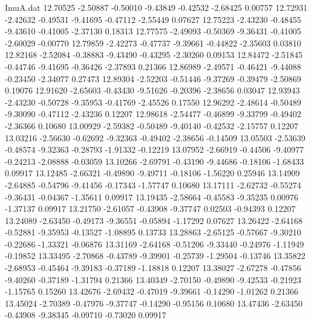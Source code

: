 \begin{filecontents}{ImuA.dat}
  12.70525   -2.50887   -0.50010   -9.43849   -0.42532   -2.68425    0.00757
  12.72931   -2.42632   -0.49531   -9.41695   -0.47112   -2.55449    0.07627
  12.75223   -2.43230   -0.48455   -9.43610   -0.41005   -2.37130    0.18313
  12.77575   -2.49093   -0.50369   -9.36431   -0.41005   -2.60029   -0.00770
  12.79859   -2.42273   -0.47737   -9.39661   -0.44822   -2.35603    0.03810
  12.82168   -2.52084   -0.38883   -9.43490   -0.43295   -2.30260    0.09153
  12.84472   -2.51845   -0.44746   -9.41695   -0.36426   -2.37893    0.21366
  12.86989   -2.49571   -0.46421   -9.44088   -0.23450   -2.34077    0.27473
  12.89304   -2.52203   -0.51446   -9.37269   -0.39479   -2.50869    0.19076
  12.91620   -2.65603   -0.43430   -9.51626   -0.20396   -2.38656    0.03047
  12.93943   -2.43230   -0.50728   -9.35953   -0.41769   -2.45526    0.17550
  12.96292   -2.48614   -0.50489   -9.30090   -0.47112   -2.43236    0.12207
  12.98618   -2.54477   -0.46899   -9.33799   -0.49402   -2.36366    0.10680
  13.00929   -2.59382   -0.50489   -9.40140   -0.42532   -2.15757    0.12207
  13.03216   -2.56630   -0.62692   -9.32363   -0.49402   -2.38656   -0.14509
  13.05503   -2.53639   -0.48574   -9.32363   -0.28793   -1.91332   -0.12219
  13.07952   -2.66919   -0.44506   -9.40977   -0.24213   -2.08888   -0.03059
  13.10266   -2.69791   -0.43190   -9.44686   -0.18106   -1.68433    0.09917
  13.12485   -2.66321   -0.49890   -9.49711   -0.18106   -1.56220    0.25946
  13.14909   -2.64885   -0.54796   -9.41456   -0.17343   -1.57747    0.10680
  13.17111   -2.62732   -0.55274   -9.36431   -0.04367   -1.35611    0.09917
  13.19435   -2.58664   -0.45583   -9.35235    0.00976   -1.37137    0.09917
  13.21750   -2.61057   -0.43908   -9.37747    0.02503   -0.94393    0.12207
  13.24089   -2.63450   -0.49173   -9.36551   -0.05894   -1.17292    0.07627
  13.26422   -2.64168   -0.52881   -9.35953   -0.13527   -1.08895    0.13733
  13.28863   -2.65125   -0.57667   -9.30210   -0.22686   -1.33321   -0.06876
  13.31169   -2.64168   -0.51206   -9.33440   -0.24976   -1.11949   -0.19852
  13.33495   -2.70868   -0.43789   -9.39901   -0.25739   -1.29504   -0.13746
  13.35822   -2.68953   -0.45464   -9.39183   -0.37189   -1.18818    0.12207
  13.38027   -2.67278   -0.47856   -9.40260   -0.37189   -1.31794    0.21366
  13.40349   -2.70150   -0.49890   -9.42533   -0.21923   -1.15765    0.15260
  13.42676   -2.69432   -0.47019   -9.39661   -0.14290   -1.01262    0.21366
  13.45024   -2.70389   -0.47976   -9.37747   -0.14290   -0.95156    0.10680
  13.47436   -2.63450   -0.43908   -9.38345   -0.09710   -0.73020    0.09917

\end{filecontents}
